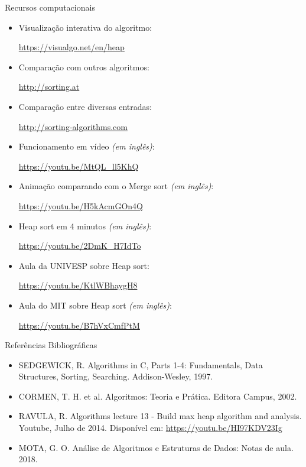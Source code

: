 \documentclass[t, 10pt]{beamer}
\begin{document}
  \begin{frame}{Recursos computacionais}
    \begin{itemize}
      \item
      Visualização interativa do algoritmo:
      
      \url{https://visualgo.net/en/heap}

      \item
      Comparação com outros algoritmos:

      \url{http://sorting.at}
      
      \item
      Comparação entre diversas entradas:
      
      \url{http://sorting-algorithms.com}
      
      \item
      Funcionamento em vídeo \textit{(em inglês)}:
      
      \url{https://youtu.be/MtQL_ll5KhQ}
      
      \item
      Animação comparando com o Merge sort \textit{(em inglês)}:
      
      \url{https://youtu.be/H5kAcmGOn4Q}
      
      \item
      Heap sort em 4 minutos \textit{(em inglês)}:
      
      \url{https://youtu.be/2DmK_H7IdTo}
      
      \item
      Aula da UNIVESP sobre Heap sort:
      
      \url{https://youtu.be/KtlWBhaygH8}
      
      \item
      Aula do MIT sobre Heap sort \textit{(em inglês)}:
      
      \url{https://youtu.be/B7hVxCmfPtM}
    \end{itemize}
  \end{frame}

  \begin{frame}{Referências Bibliográficas}
    \begin{itemize}
      \item SEDGEWICK, R. Algorithms in C, Parts 1-4: Fundamentals, Data Structures, Sorting, Searching. 
        Addison-Wesley, 1997.
        
      \item CORMEN, T\@. H\@. et al. Algoritmos: Teoria e Prática. Editora Campus, 2002.
      
      \item RAVULA, R\@. Algorithms lecture 13 - Build max heap algorithm and analysis. 
      Youtube, Julho de 2014. Disponível em: \url{https://youtu.be/HI97KDV23Ig}
      
      \item MOTA, G\@. O. Análise de Algoritmos e Estruturas de Dados: Notas de aula. 2018.
    \end{itemize}
  \end{frame}
\end{document}
